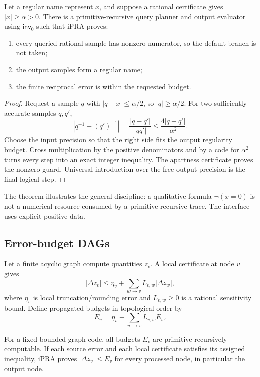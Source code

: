 \begin{theorem}
Let a regular name represent \(x\), and suppose a rational certificate gives \(|x|\geq\alpha>0\).  There is a primitive-recursive query planner and output evaluator using \(\mathsf{inv}_0\) such that iPRA proves:
\begin{enumerate}
\item every queried rational sample has nonzero numerator, so the default branch is not taken;
\item the output samples form a regular name;
\item the finite reciprocal error is within the requested budget.
\end{enumerate}
\end{theorem}

\begin{proof}
Request a sample \(q\) with \(|q-x|\leq\alpha/2\), so \(|q|\geq\alpha/2\).  For two sufficiently accurate samples \(q,q'\),
\[
 |q^{-1}-(q')^{-1}|=\frac{|q-q'|}{|qq'|}
 \leq \frac{4|q-q'|}{\alpha^2}.
\]
Choose the input precision so that the right side fits the output regularity budget.  Cross multiplication by the positive denominators and by a code for \(\alpha^2\) turns every step into an exact integer inequality.  The apartness certificate proves the nonzero guard.  Universal introduction over the free output precision is the final logical step.
\end{proof}

The theorem illustrates the general discipline: a qualitative formula \(\neg(x=0)\) is not a numerical resource consumed by a primitive-recursive trace.  The interface uses explicit positive data.

\subsection{Error-budget DAGs}

Let a finite acyclic graph compute quantities \(z_v\).  A local certificate at node \(v\) gives
\[
  |\Delta z_v|\leq \eta_v+\sum_{w\to v}L_{v,w}|\Delta z_w|,
\]
where \(\eta_v\) is local truncation/rounding error and \(L_{v,w}\geq0\) is a rational sensitivity bound.  Define propagated budgets in topological order by
\[
  E_v=\eta_v+\sum_{w\to v}L_{v,w}E_w.
\]

\begin{theorem}\label{thm:error-dag}
For a fixed bounded graph code, all budgets \(E_v\) are primitive-recursively computable.  If each source error and each local certificate satisfies its assigned inequality, iPRA proves \(|\Delta z_v|\leq E_v\) for every processed node, in particular the output node.
\end{theorem}

